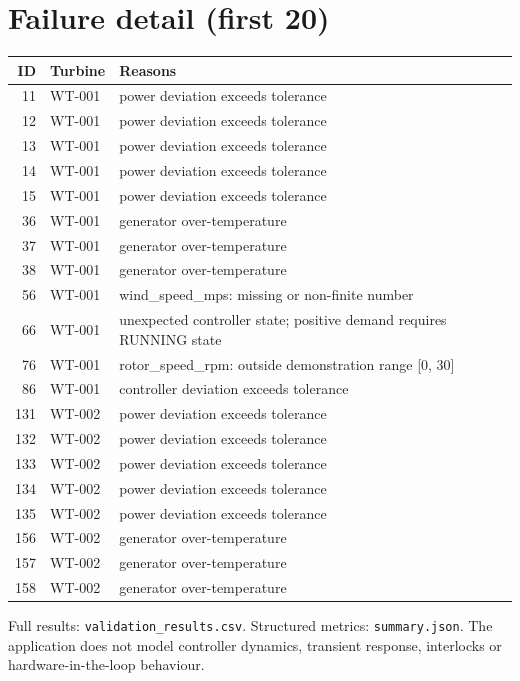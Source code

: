 \documentclass[10pt,a4paper]{article}
\begin{document}
\section*{Failure detail (first 20)}
\begin{longtable}{r p{20mm} p{110mm}}\toprule ID & Turbine & Reasons \\ \midrule
11 & WT-001 & power deviation exceeds tolerance \\ \hline
12 & WT-001 & power deviation exceeds tolerance \\ \hline
13 & WT-001 & power deviation exceeds tolerance \\ \hline
14 & WT-001 & power deviation exceeds tolerance \\ \hline
15 & WT-001 & power deviation exceeds tolerance \\ \hline
36 & WT-001 & generator over-temperature \\ \hline
37 & WT-001 & generator over-temperature \\ \hline
38 & WT-001 & generator over-temperature \\ \hline
56 & WT-001 & wind\_speed\_mps: missing or non-finite number \\ \hline
66 & WT-001 & unexpected controller state; positive demand requires RUNNING state \\ \hline
76 & WT-001 & rotor\_speed\_rpm: outside demonstration range [0, 30] \\ \hline
86 & WT-001 & controller deviation exceeds tolerance \\ \hline
131 & WT-002 & power deviation exceeds tolerance \\ \hline
132 & WT-002 & power deviation exceeds tolerance \\ \hline
133 & WT-002 & power deviation exceeds tolerance \\ \hline
134 & WT-002 & power deviation exceeds tolerance \\ \hline
135 & WT-002 & power deviation exceeds tolerance \\ \hline
156 & WT-002 & generator over-temperature \\ \hline
157 & WT-002 & generator over-temperature \\ \hline
158 & WT-002 & generator over-temperature \\ \hline
\bottomrule\end{longtable}
Full results: \texttt{validation\_results.csv}. Structured metrics:
\texttt{summary.json}. The application does not model controller dynamics,
transient response, interlocks or hardware-in-the-loop behaviour.
\end{document}
